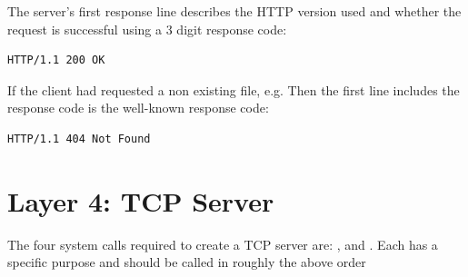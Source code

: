 The server's first response line describes the HTTP version used and whether the request is successful using a 3 digit response code:

\begin{lstlisting}
HTTP/1.1 200 OK
\end{lstlisting}

If the client had requested a non existing file, e.g.
 Then the first line includes the response code is the well-known  response code:

\begin{lstlisting}
HTTP/1.1 404 Not Found
\end{lstlisting}


\section{Layer 4: TCP Server}

The four system calls required to create a TCP server are: ,   and .
Each has a specific purpose and should be called in roughly the above order


